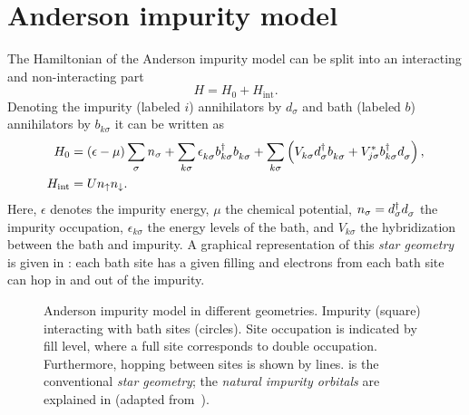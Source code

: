 \section{Anderson impurity model}
\label{sec:anderson-impurity-model}

The Hamiltonian of the Anderson impurity model \cite{Anderson1961} can be split into
an interacting and non-interacting part
\begin{equation}
    H = H_0 + H_\mathrm{int}.
    \label{eq:impurity-Hamiltonian}
\end{equation}
Denoting the impurity (labeled $i$) annihilators by $d_\sigma$
and bath (labeled $b$) annihilators by $b_{k\sigma}$
it can be written as
\begin{align}
    H_0
     & =
    (\epsilon - \mu) \sum_{\pk\sigma} n_\sigma
    +
    \sum_{k\sigma} \epsilon_{k\sigma}^{\pdag} b^\dag_{k\sigma} b^{\pdag}_{k\sigma}
    +
    \sum_{k\sigma} \left(V^{\ps}_{k\sigma} d^\dag_{\pk\sigma} b^{\pdag}_{k\sigma}
    + V_{j\sigma}^* b^\dag_{k\sigma} d^{\pdag}_{\pk\sigma} \right),
    \label{eq:anderson-non-interacting}
    \\
    H_\mathrm{int}
     & =
    U n_\uparrow n_\downarrow.
    \label{eq:anderson-interaction}
\end{align}
Here,
$\epsilon$ denotes the impurity energy,
$\mu$ the chemical potential,
$n_\sigma = d^\dag_\sigma d^{\pdag}_\sigma$ the impurity occupation,
$\epsilon_{k\sigma}$ the energy levels of the bath,
and $V_{k\sigma}$ the hybridization between the bath and impurity.
A graphical representation of this \emph{star geometry} is given in :
each bath site has a given filling
and electrons from each bath site can hop in and out of the impurity.

\begin{figure}[ht]
    \centering
    \savebox{\imagebox}{} %
    \begin{subfigure}{0.45\textwidth}
        \centering
        \usebox{\imagebox}
        \caption{}
        \label{subfig:geometry-star}
    \end{subfigure}
    \begin{subfigure}{0.45\textwidth}
        \centering
        \raisebox{\dimexpr0.5\ht\imagebox-0.5\height}
        {
            
        }
        \caption{}
        \label{subfig:geometry-natural-impurity-orbitals}
    \end{subfigure}
    \caption{
        Anderson impurity model in different geometries.
        Impurity (square) interacting with bath sites (circles).
        Site occupation is indicated by fill level,
        where a full site corresponds to double occupation.
        Furthermore, hopping between sites is shown by lines.
         is the conventional \emph{star geometry};
         the \emph{natural impurity orbitals}
        are explained in 
        (adapted from~\cite{Lu2019}).
    }
\end{figure}

